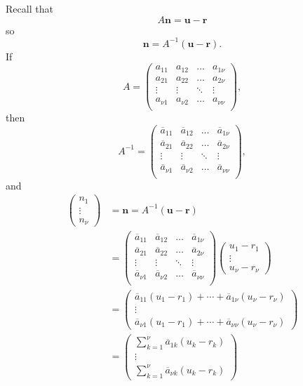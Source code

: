 Recall that 
\[A\mathbf{n} = \mathbf{u} - \mathbf{r}\]
so
\[\mathbf{n} = A^{-1}(\mathbf{u} - \mathbf{r}).\]
If 
\[A = \begin{pmatrix}
	a_{11} & a_{12} & \dots & a_{1\nu} \\ a_{21} & a_{22} & \dots & a_{2\nu}\\
	\vdots & \vdots & \ddots & \vdots\\ a_{\nu 1} & a_{\nu 2} & \dots & a_{\nu\nu}\\ 
	\end{pmatrix},\]
then 
\[A^{-1} = \begin{pmatrix}
	\overline{a}_{11} & \overline{a}_{12} & \dots & \overline{a}_{1\nu} \\ \overline{a}_{21} & \overline{a}_{22} 	& \dots & \overline{a}_{2\nu}\\
	\vdots & \vdots & \ddots & \vdots\\ \overline{a}_{\nu 1} & \overline{a}_{\nu 2} & \dots 
	& \overline{a}_{\nu\nu}\\ 
	\end{pmatrix},\]
and 
\begin{align*}
\begin{pmatrix} n_1 \\  \vdots \\ n_{\nu} \end{pmatrix}	
	& = \mathbf{n}  = A^{-1}(\mathbf{u} - \mathbf{r})\\
	& = \begin{pmatrix}
	\overline{a}_{11} & \overline{a}_{12} & \dots & \overline{a}_{1\nu} \\ \overline{a}_{21} & \overline{a}_{22} 	& \dots & \overline{a}_{2\nu}\\
	\vdots & \vdots & \ddots & \vdots\\ \overline{a}_{\nu 1} & \overline{a}_{\nu 2} & \dots 
	& \overline{a}_{\nu\nu}\\ 
	\end{pmatrix}
	\begin{pmatrix} u_1-r_1 \\  \vdots \\ u_{\nu}-r_{\nu} \end{pmatrix}\\
	& = \begin{pmatrix} \overline{a}_{11}(u_1-r_1) + \cdots + \overline{a}_{1\nu}(u_{\nu}-r_{\nu}) \\  \vdots \\ \overline{a}_{\nu 1}(u_1-r_1) + \cdots + \overline{a}_{\nu \nu}(u_{\nu}-r_{\nu}) \end{pmatrix}\\
	& = \begin{pmatrix} \sum_{k=1}^{\nu} \overline{a}_{1k}(u_k-r_k)\\  \vdots \\ \sum_{k=1}^{\nu} \overline{a}_{\nu k}(u_k-r_k) \end{pmatrix}\\
\end{align*}
